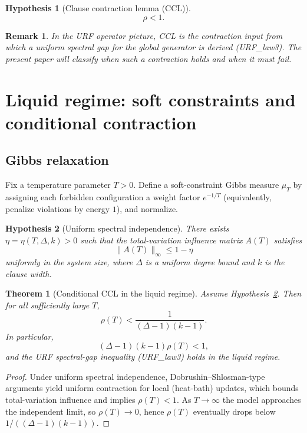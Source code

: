 \documentclass[11pt]{article}
\newtheorem{theorem}{Theorem}
\newtheorem{hypothesis}{Hypothesis}
\newtheorem{remark}{Remark}
\begin{document}
\begin{hypothesis}[Clause contraction lemma (CCL)]\label{hyp:ccl}
\[
\rho < 1.
\]
\end{hypothesis}

\begin{remark}
In the URF operator picture, CCL is the contraction input from which a uniform spectral gap for the global generator
is derived (URF\_law3). The present paper will \emph{classify} when such a contraction holds and when it must fail.
\end{remark}

\section{Liquid regime: soft constraints and conditional contraction}

\subsection{Gibbs relaxation}

Fix a temperature parameter $T>0$. Define a soft-constraint Gibbs measure $\mu_T$ by assigning each forbidden configuration
a weight factor $e^{-1/T}$ (equivalently, penalize violations by energy $1$), and normalize.

\begin{hypothesis}[Uniform spectral independence]\label{hyp:usi}
There exists $\eta=\eta(T,\Delta,k)>0$ such that the total-variation influence matrix $A(T)$ satisfies
\[
\|A(T)\|_{\infty} \le 1-\eta
\]
uniformly in the system size, where $\Delta$ is a uniform degree bound and $k$ is the clause width.
\end{hypothesis}

\begin{theorem}[Conditional CCL in the liquid regime]\label{thm:liquid}
Assume Hypothesis~\ref{hyp:usi}. Then for all sufficiently large $T$,
\[
\rho(T) < \frac{1}{(\Delta-1)(k-1)}.
\]
In particular,
\[
(\Delta-1)(k-1)\rho(T) < 1,
\]
and the URF spectral-gap inequality (URF\_law3) holds in the liquid regime.
\end{theorem}

\begin{proof}
Under uniform spectral independence, Dobrushin--Shlosman-type arguments yield uniform contraction for local (heat-bath)
updates, which bounds total-variation influence and implies $\rho(T)<1$. As $T\to\infty$ the model approaches
the independent limit, so $\rho(T)\to 0$, hence $\rho(T)$ eventually drops below $1/((\Delta-1)(k-1))$.
\end{proof}
\end{document}
